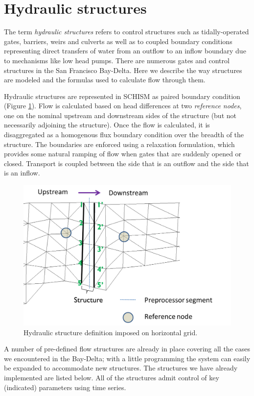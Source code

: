 \section{Hydraulic structures}
\label{sec-structures}
The term {\em hydraulic structures} refers to control structures such as tidally-operated gates, 
barriers, weirs and culverts as well as to coupled boundary conditions 
representing direct transfers of water from an outflow to an inflow boundary due to mechanisms like low head pumps. 
There are numerous gates and control structures in the San Francisco Bay-Delta. Here we describe the way structures are modeled and the formulas used to calculate flow through them. 

Hydraulic structures are represented in SCHISM as paired boundary condition (Figure \ref{fig:structmesh}). Flow is calculated based on head differences at two {\em reference nodes}, one on the nominal upstream and downstream sides of the structure (but not necessarily adjoining the structure). Once the flow is calculated, it is disaggregated as a homogenous flux boundary condition over the breadth of the structure. The boundaries are enforced using a relaxation formulation, which provides some natural ramping of flow when gates that are suddenly opened or closed. Transport is coupled between the side that is an outflow and the side that is an inflow.

\begin{figure}
	\centering
		\includegraphics[scale=1]{image/struct}
	\caption{Hydraulic structure definition imposed on horizontal grid.}
	\label{fig:structmesh}
\end{figure}

A number of pre-defined flow structures are already in place covering all the cases we encountered in the Bay-Delta; with a little programming the system can easily be expanded to accommodate new structures.  
The structures we have already implemented are listed below. All of the structures admit control of key (indicated) parameters using time series. 

